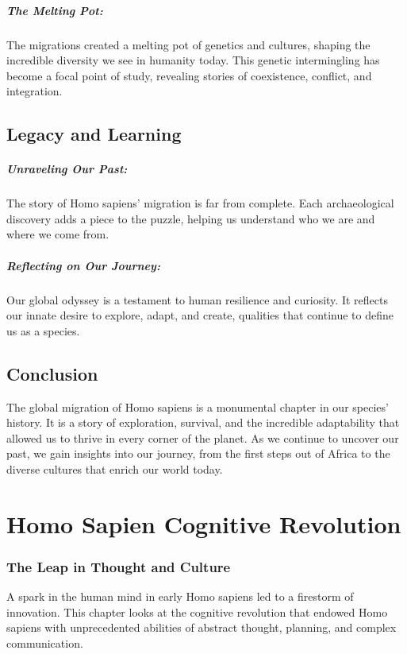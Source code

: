 \documentclass{book}
\begin{document}
\paragraph{The Melting Pot:}
The migrations created a melting pot of genetics and cultures, shaping the incredible diversity we see in humanity today. This genetic intermingling has become a focal point of study, revealing stories of coexistence, conflict, and integration.

\section*{Legacy and Learning}

\paragraph{Unraveling Our Past:}
The story of Homo sapiens’ migration is far from complete. Each archaeological discovery adds a piece to the puzzle, helping us understand who we are and where we come from.

\paragraph{Reflecting on Our Journey:}
Our global odyssey is a testament to human resilience and curiosity. It reflects our innate desire to explore, adapt, and create, qualities that continue to define us as a species.

\section*{Conclusion}

The global migration of Homo sapiens is a monumental chapter in our species’ history. It is a story of exploration, survival, and the incredible adaptability that allowed us to thrive in every corner of the planet. As we continue to uncover our past, we gain insights into our journey, from the first steps out of Africa to the diverse cultures that enrich our world today.

\chapter{Homo Sapien Cognitive Revolution}
\subsection*{The Leap in Thought and Culture}
A spark in the human mind in early Homo sapiens led to a firestorm of innovation. This chapter looks at the cognitive revolution that endowed Homo sapiens with unprecedented abilities of abstract thought, planning, and complex communication.
\end{document}
